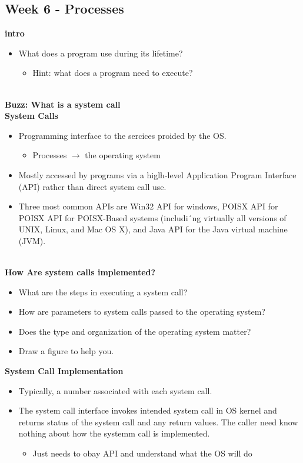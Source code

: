 
\subsection*{Week 6 - Processes}
\textbf{intro}
\begin{itemize}
\item What does a program use during its lifetime?
\begin{itemize}
\item Hint: what does a program need to execute?
\end{itemize}
\end{itemize}
\\
\textbf{Buzz: What is a system call}
\\
\textbf{System Calls}
\begin{itemize}
\item Programming interface to the sercices proided by the OS.
\begin{itemize}
\item Processes $\rightarrow$ the operating system
\end{itemize}
\item Mostly accessed by programs via a higlh-level Application Program Interface (API) rather than direct system call use.
\item Three most common APIs are Win32 API for windows, POISX API for POISX API for POISX-Based systems (includi´ng virtually all versions of UNIX, Linux, and Mac OS X), and Java API for the Java virtual machine (JVM).
\end{itemize}
\\
\textbf{How Are system calls implemented?}
\begin{itemize}
\item What are the steps in executing a system call?
\item How are parameters to system calls passed to the operating system?
\item Does the type and organization of the operating system matter?
\item Draw a figure to help you.
\end{itemize}
\textbf{System Call Implementation}
\begin{itemize}
\item Typically, a number associated with each system call.
\item The system call interface invokes intended system call in OS kernel and returns status of the system call and any return values.
The caller need know nothing about how the systemm call is implemented.
\begin{itemize}
\item Just needs to obay API and understand what the OS will do
\end{itemize}
\end{itemize}